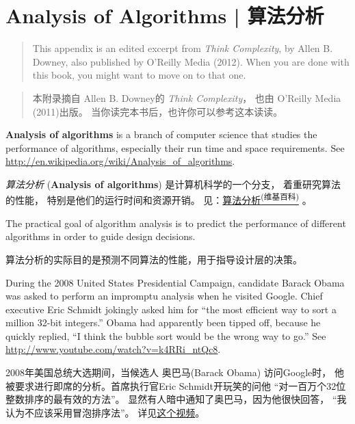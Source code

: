 

\chapter{Analysis of Algorithms  |  算法分析}
\label{algorithms}

\begin{quote}
This appendix is an edited excerpt from {\it Think Complexity}, by
Allen B. Downey, also published by O'Reilly Media (2012).  When you
are done with this book, you might want to move on to that one.
\end{quote}

\begin{quote}
本附录摘自 Allen B. Downey的 {\em Think Complexity}， 也由 O’Reilly Media (2011)出版。 当你读完本书后，也许你可以参考这本读读。
\end{quote}

{\bf Analysis of algorithms} is a branch of computer science that
studies the performance of algorithms, especially their run time and
space requirements.  See
\url{http://en.wikipedia.org/wiki/Analysis_of_algorithms}.

{\em 算法分析} ({\bf Analysis of algorithms}) 是计算机科学的一个分支，
 着重研究算法的性能， 特别是他们的运行时间和资源开销。
见：\href{http://en.wikipedia.org/wiki/Analysis_of_algorithms}{算法分析\textsuperscript{(维基百科)}} 。
 

The practical goal of algorithm analysis is to predict the performance
of different algorithms in order to guide design decisions.

算法分析的实际目的是预测不同算法的性能，用于指导设计层的决策。

During the 2008 United States Presidential Campaign, candidate
Barack Obama was asked to perform an impromptu analysis when
he visited Google.  Chief executive Eric Schmidt jokingly asked him
for ``the most efficient way to sort a million 32-bit integers.''
Obama had apparently been tipped off, because he quickly
replied, ``I think the bubble sort would be the wrong way to go.''
See \url{http://www.youtube.com/watch?v=k4RRi_ntQc8}.

2008年美国总统大选期间，当候选人 奥巴马(Barack Obama) 访问Google时，
他被要求进行即席的分析。首席执行官Eric Schmidt开玩笑的问他
``对一百万个32位整数排序的最有效的方法''。
显然有人暗中通知了奥巴马，因为他很快回答， ``我认为不应该采用冒泡排序法''。
详见\href{http://www.youtube.com/watch?v=k4RRi_ntQc8}{这个视频}。
    

